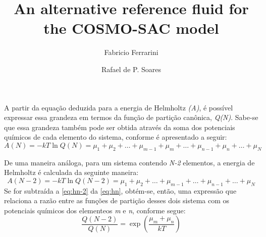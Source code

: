 \documentclass[3p]{elsarticle}
\begin{document}
\begin{frontmatter} 
\title{An alternative reference fluid for the COSMO-SAC model}
\author{Fabricio Ferrarini}
\author{Rafael de P. Soares}



\address{Departamento de Engenharia Qu\'imica, Escola de 
Engenharia, Universidade Federal do Rio Grande do Sul,
Rua Engenheiro Luis Englert, s/n, Bairro Farroupilha, CEP 90040-040, Porto
Alegre, RS, Brazil\\July 2013}


\end{frontmatter}

A partir da equação deduzida para a energia de Helmholtz \emph{(A)},  é possível
expressar essa grandeza em termos da função de partição canônica, \emph{Q(N)}.
Sabe-se que essa grandeza também pode ser obtida através da soma dos potenciais
químicos de cada elemento do sistema, conforme é apresentado a seguir:
\begin{equation}\label{eq:hn}
A(N) = -kT\ln Q(N) = \mu_1 + \mu_2 + \ldots+ \mu_{m-1} + \mu_m + \ldots
+ \mu_{n-1} + \mu_{n} + \ldots + \mu_N
\end{equation}

De uma maneira análoga, para um sistema contendo \emph{N-2} elementos, a energia
de Helmholtz é calculada da seguinte maneira:
\begin{equation}\label{eq:hn-2}
A(N-2) = -kT\ln Q(N-2) = \mu_1 + \mu_2 + \ldots+ \mu_{m-1} + \ldots
+ \mu_{n-1} + \ldots + \mu_N
\end{equation}
Se for subtraída a \autoref{eq:hn-2} da \autoref{eq:hn}, obtém-se, então, uma
expressão que relaciona a razão entre as funções de partição desses dois
sistema com os potenciais químicos dos elementeos \emph{m} e \emph{n}, conforme
segue:
\begin{equation}\label{eq:razaoQ}
\frac{Q(N-2)}{Q(N)} = \exp\left(\frac{\mu_m + \mu_n}{kT}\right)
\end{equation}
\end{document}

